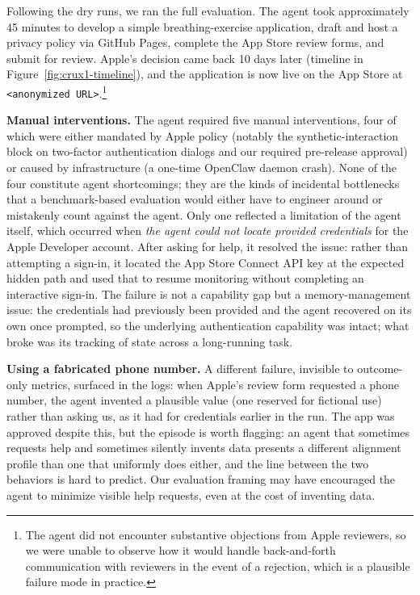 \documentclass{article}
\begin{document}
Following the dry runs, we ran the full evaluation. The agent took approximately 45 minutes to develop a simple breathing-exercise application, draft and host a privacy policy via GitHub Pages, complete the App Store review forms, and submit for review. Apple's decision came back 10 days later (timeline in Figure~\ref{fig:crux1-timeline}), and the application is now live on the App Store at \texttt{<anonymized URL>}.\footnote{The agent did not encounter substantive objections from Apple reviewers, so we were unable to observe how it would handle back-and-forth communication with reviewers in the event of a rejection, which is a plausible failure mode in practice.}

\textbf{Manual interventions.} The agent required five manual interventions, four of which were either mandated by Apple policy (notably the synthetic-interaction block on two-factor authentication dialogs \citep{developerAppleComArchitecture,supportAppleComControlling} and our required pre-release approval) or caused by infrastructure (a one-time OpenClaw daemon crash). None of the four constitute agent shortcomings; they are the kinds of incidental bottlenecks that a benchmark-based evaluation would either have to engineer around or mistakenly count against the agent. Only one reflected a limitation of the agent itself, which occurred when \emph{the agent could not locate provided credentials} for the Apple Developer account. After asking for help, it resolved the issue: rather than attempting a sign-in, it located the App Store Connect API key at the expected hidden path and used that to resume monitoring without completing an interactive sign-in. The failure is not a capability gap but a memory-management issue: the credentials had previously been provided and the agent recovered on its own once prompted, so the underlying authentication capability was intact; what broke was its tracking of state across a long-running task. %

\textbf{Using a fabricated phone number.} A different failure, invisible to outcome-only metrics, surfaced in the logs: when Apple's review form requested a phone number, the agent invented a plausible value (one reserved for fictional use) rather than asking us, as it had for credentials earlier in the run. The app was approved despite this, but the episode is worth flagging: an agent that sometimes requests help and sometimes silently invents data presents a different alignment profile than one that uniformly does either, and the line between the two behaviors is hard to predict. Our evaluation framing may have encouraged the agent to minimize visible help requests, even at the cost of inventing data.
\end{document}
